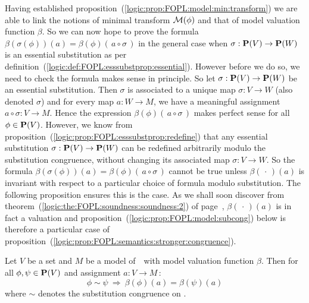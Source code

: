 Having established
proposition~(\ref{logic:prop:FOPL:model:min:transform}) we are able
to link the notions of minimal transform ${\cal M}(\phi)$ and that
of model valuation function $\beta$. So we can now hope to prove the
formula $\beta(\sigma(\phi))(a)=\beta(\phi)(\,a\circ\sigma\,)$ in
the general case when $\sigma:\mbox{${\bf P}(V)$}\to{\bf P}(W)$ is an essential
substitution as per
definition~(\ref{logic:def:FOPL:esssubstprop:essential}). However
before we do so, we need to check the formula makes sense in
principle. So let $\sigma:\mbox{${\bf P}(V)$}\to{\bf P}(W)$ be an essential
substitution. Then $\sigma$ is associated to a unique map
$\sigma:V\to W$ (also denoted $\sigma$) and for every map $a:W\to
M$, we have a meaningful assignment $a\circ\sigma:V\to M$. Hence the
expression $\beta(\phi)(\,a\circ\sigma\,)$ makes perfect sense for
all $\phi\in\mbox{${\bf P}(V)$}$. However, we know from
proposition~(\ref{logic:prop:FOPL:esssubstprop:redefine}) that any
essential substitution $\sigma:\mbox{${\bf P}(V)$}\to{\bf P}(W)$ can be redefined
arbitrarily modulo the substitution congruence, without changing its
associated map $\sigma:V\to W$. So the formula
$\beta(\sigma(\phi))(a)=\beta(\phi)(\,a\circ\sigma\,)$ cannot be
true unless $\beta(\,\cdot\,)(a)$ is invariant with respect to a
particular choice of formula modulo substitution. The following
proposition ensures this is the case. As we shall soon discover from
theorem~(\ref{logic:the:FOPL:soundness:soundness:2}) of
page~\pageref{logic:the:FOPL:soundness:soundness:2},
$\beta(\,\cdot\,)(a)$ is in fact a valuation and
proposition~(\ref{logic:prop:FOPL:model:subcong}) below is therefore
a particular case of
proposition~(\ref{logic:prop:FOPL:semantics:stronger:congruence}).
\begin{prop}\label{logic:prop:FOPL:model:subcong}
Let $V$ be a set and $M$ be a model of\, \pv\ with model valuation
function $\beta$. Then for all $\phi,\psi\in\mbox{${\bf P}(V)$}$ and assignment
$a:V\to M$\,:
    \[
    \phi\sim\psi\ \Rightarrow\ \beta(\phi)(a)=\beta(\psi)(a)
    \]
where $\sim$ denotes the substitution congruence on \pv.
\end{prop}
